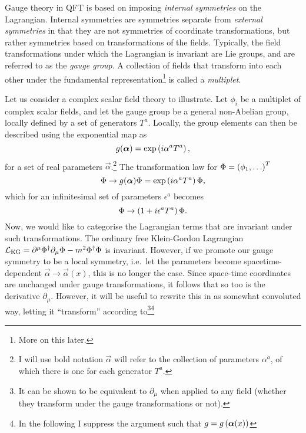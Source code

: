\documentclass[../main.tex]{subfiles}
\begin{document}
Gauge theory in QFT is based on imposing \textit{internal symmetries} on the
Lagrangian. Internal symmetries are symmetries separate from \textit{external
    symmetries} in that they are not symmetries of coordinate transformations,
but
rather symmetries based on transformations of the fields. Typically, the field
transformations under which the Lagrangian is invariant are Lie groups, and are
referred to as the \textit{gauge group}. A collection of fields that transform
into each other under the fundamental representation\footnote{More on this
    later.} is called a \textit{multiplet}.

Let us consider a complex scalar field theory to illustrate. Let \(\phi_i\) be
a multiplet of complex scalar fields, and let the gauge group be a general
non-Abelian group, locally defined by a set of generators \(T^a\). Locally, the
group elements can then be described using the exponential map as\needcite{}
\begin{equation}
    g(\boldsymbol{\alpha}) = \operatorname{exp}\left(i \alpha^a T^a\right),
\end{equation}
for a set of real parameters \(\vec{\alpha}\).\footnote{I will use bold
    notation \(\vec\alpha\) will refer to the collection of parameters
    \(\alpha^a\), of which there is one for each generator \(T^a\).}
The transformation law for \(\Phi = \left(\phi_1, \ldots\right)^T\)
\begin{equation}
    \label{qft:eq:gauge_transformation}
    \Phi \to g(\boldsymbol{\alpha}) \Phi = \operatorname{exp}\left(i \alpha^a T^a\right) \Phi,
\end{equation}
which for an infinitesimal set of parameters \(\epsilon^a\) becomes
\begin{equation}
    \Phi \to \left(1 + i \epsilon^a T^a\right) \Phi.
\end{equation}
\medskip
Now, we would like to categorise the Lagrangian terms that are invariant under
such transformations.
The ordinary free Klein-Gordon Lagrangian \(\mathcal{L}_\text{KG} = \partial^\mu
\Phi^\dagger \partial_\mu \Phi - m^2 \Phi^\dagger \Phi\) is invariant.
However, if we promote our gauge symmetry to be a local symmetry, i.e.\ let the
parameters become spacetime-dependent \(\vec{\alpha} \to \vec{\alpha}(x)\),
this is no longer the case.
Since space-time coordinates are unchanged under gauge transformations, it
follows that so too is the derivative \(\partial_\mu\).
However, it will be useful to rewrite this in as somewhat convoluted way,
letting it ``transform'' according to\footnote{It can be shown to be equivalent
    to \(\partial_\mu\) when applied to any field (whether they transform under
    the
    gauge transformations or not).}\footnote{In the following I suppress the
    argument such that \(g = g\left(\boldsymbol{\alpha}(x)\right)\)}
\end{document}
